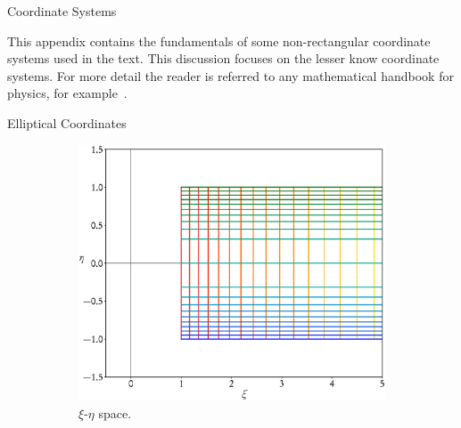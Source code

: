 \documentclass[letterpaper, 11 pt]{report}
\begin{document}
\begin{appendices}

   \begin{chapter}{Coordinate Systems \label{chap:coords}}
      

      This appendix contains the fundamentals of some non-rectangular coordinate systems used in the
      text. This discussion focuses on the lesser know coordinate systems. For more detail the reader
      is referred to any mathematical handbook for physics, for example~\cite{coord1, coord2}.

      \begin{section}{Elliptical Coordinates \label{sec:elliptic}}

         \begin{figure}[t]
            \centering
            \begin{subfigure}{.5\textwidth}
               \centering
               \includegraphics[width=\linewidth]{./images/appendix/xieta.eps}
               \caption{$\xi$-$\eta$ space. \label{fig:xieta}}
            \end{subfigure}%
            \begin{subfigure}{.5\textwidth}
               \centering

\end{subfigure}
\end{figure}
\end{section}
\end{chapter}
\end{appendices}
\end{document}
